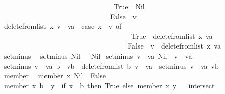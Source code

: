 \begin{isabellebody}
\ \ \ \ \ \ \ \ \ \ \ \ \ \ \ \ \ \ \ \ \ \ \ \ \ \ \ \ \ \ \ \ True\ {\isasymRightarrow}\ Nil\isanewline
\ \ \ \ \ \ \ \ \ \ \ \ \ \ \ \ \ \ \ \ \ \ \ \ \ \ \ \ \ \ {\isacharbar}\ False\ {\isasymRightarrow}\ {\isacharbrackleft}v{\isacharbrackright}{\isacharparenright}{\isachardoublequoteclose}\isanewline
{\isacharbar}\ {\isachardoublequoteopen}delete{\isacharunderscore}from{\isacharunderscore}list\ x\ {\isacharparenleft}v\ {\isacharhash}\ va{\isacharparenright}\ {\isacharequal}\ {\isacharparenleft}case\ x\ {\isacharequal}\ v\ of\isanewline
\ \ \ \ \ \ \ \ \ \ \ \ \ \ \ \ \ \ \ \ \ \ \ \ \ \ \ \ \ \ \ \ \ \ \ \ \ True\ {\isasymRightarrow}\ delete{\isacharunderscore}from{\isacharunderscore}list\ x\ va\isanewline
\ \ \ \ \ \ \ \ \ \ \ \ \ \ \ \ \ \ \ \ \ \ \ \ \ \ \ \ \ \ \ \ \ \ \ {\isacharbar}\ False\ {\isasymRightarrow}\ {\isacharparenleft}v\ {\isacharhash}\ {\isacharparenleft}delete{\isacharunderscore}from{\isacharunderscore}list\ x\ va{\isacharparenright}{\isacharparenright}{\isacharparenright}{\isachardoublequoteclose}\isanewline
\isanewline
\ \isanewline
{}\isamarkupfalse%
\ setminus\isanewline
{}\isanewline
\ \ {\isachardoublequoteopen}setminus\ Nil\ {\isacharunderscore}\ {\isacharequal}\ Nil{\isachardoublequoteclose}\isanewline
{\isacharbar}\ {\isachardoublequoteopen}setminus\ {\isacharparenleft}v\ {\isacharhash}\ va{\isacharparenright}\ Nil\ {\isacharequal}\ {\isacharparenleft}v\ {\isacharhash}\ va{\isacharparenright}{\isachardoublequoteclose}\isanewline
{\isacharbar}\ {\isachardoublequoteopen}setminus\ {\isacharparenleft}v\ {\isacharhash}\ va{\isacharparenright}\ {\isacharparenleft}b\ {\isacharhash}\ vb{\isacharparenright}\ {\isacharequal}\ {\isacharparenleft}{\isacharparenleft}delete{\isacharunderscore}from{\isacharunderscore}list\ b\ {\isacharparenleft}v\ {\isacharhash}\ va{\isacharparenright}{\isacharparenright}\ {\isacharat}\ {\isacharparenleft}setminus\ {\isacharparenleft}v\ {\isacharhash}\ va{\isacharparenright}\ vb{\isacharparenright}{\isacharparenright}{\isachardoublequoteclose}\isanewline
\isanewline
\ \isanewline
{}\isamarkupfalse%
\ member\isanewline
{}\isanewline
\ \ {\isachardoublequoteopen}member\ x\ Nil\ {\isacharequal}\ False{\isachardoublequoteclose}\isanewline
{\isacharbar}\ {\isachardoublequoteopen}member\ x\ {\isacharparenleft}b\ {\isacharhash}\ y{\isacharparenright}\ {\isacharequal}\ {\isacharparenleft}if\ x\ {\isacharequal}\ b\ then\ True\ else\ member\ x\ y{\isacharparenright}{\isachardoublequoteclose}\isanewline
\ \isanewline
{}\isamarkupfalse%
\ intersect\isanewline

\end{isabellebody}
